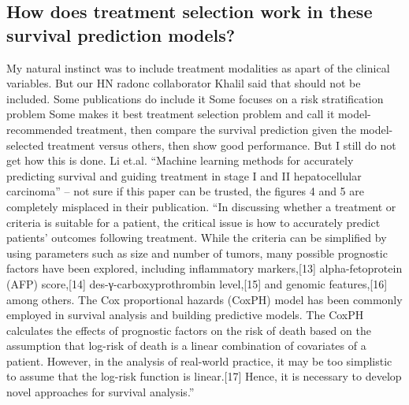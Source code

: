\documentclass{article}%
\begin{document}
\subsection{How does treatment selection work in these survival prediction models? }%
\label{subsec:Howdoestreatmentselectionworkinthesesurvivalpredictionmodels?}%

%
My natural instinct was to include treatment modalities as apart of the clinical variables. But our HN radonc collaborator Khalil said that should not be included. %
\newline%
\newline%
%
Some publications do include it %
\newline%
\newline%
%
Some focuses on a risk stratification problem %
\newline%
\newline%
%
Some makes it best treatment selection problem and call it model{-}recommended treatment, then compare the survival prediction given the model{-}selected treatment versus others, then show good performance. But I still do not get how this is done. %
\newline%
\newline%
%
Li et.al. “Machine learning methods for accurately predicting survival and guiding treatment in stage I and II hepatocellular carcinoma” – not sure if this paper can be trusted, the figures 4 and 5 are completely misplaced in their publication. %
\newline%
\newline%
%
“In discussing whether a treatment or criteria is suitable for a patient, the critical issue is how to accurately predict patients’ outcomes following treatment. While the criteria can be simplified by using parameters such as size and number of tumors, many possible prognostic factors have been explored, including inflammatory markers,{[}13{]} alpha{-}fetoprotein (AFP) score,{[}14{]} des{-}γ{-}carboxyprothrombin level,{[}15{]} and genomic features,{[}16{]} among others. The Cox proportional hazards (CoxPH) model has been commonly employed in survival analysis and building predictive models. The CoxPH calculates the effects of prognostic factors on the risk of death based on the assumption that log{-}risk of death is a linear combination of covariates of a patient. However, in the analysis of real{-}world practice, it may be too simplistic to assume that the log{-}risk function is linear.{[}17{]} Hence, it is necessary to develop novel approaches for survival analysis.”%
\end{document}
